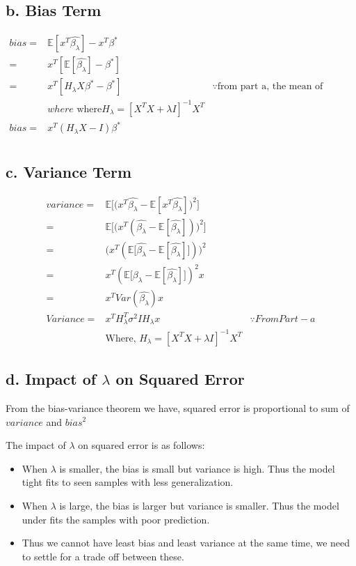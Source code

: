 \documentclass[letterpaper,doc,notimes]{apa6}
\begin{document}
\subsection{b. Bias Term}
\begin{align*}
	bias = & \mathbb{E}[x^T\hat{\beta_\lambda}] - x^T\beta^* & \\
	      = &x^T[ \mathbb{E}[\hat{\beta_\lambda}] - \beta^*] &  \\
	      = & x^T[H_\lambda X \beta^* - \beta^*] & \because \text{from part a, the mean of Gaussian} \\
			 &where \text{ where} H_\lambda = [ X^TX +  \lambda I ]^{-1}  X^T & \\    
   bias = & x^T(H_\lambda X  - I) \beta^* & \\
\end{align*}
\subsection{c. Variance Term}
\begin{align*}
	variance = & \mathbb{E} \bigg[ \big( x^T\hat{\beta_\lambda} - \mathbb{E}[x^T\hat{\beta_\lambda}] \big)^2 \bigg] & \\
	= & \mathbb{E} \bigg[ \big( x^T (\hat{\beta_\lambda} - \mathbb{E}[\hat{\beta_\lambda}] )\big)^2 \bigg]  &\\
	= & \bigg( x^T ( \mathbb{E}\big[\hat{\beta_\lambda} - \mathbb{E}[\hat{\beta_\lambda}] \big] )\bigg)^2  &\\
	= &  x^T ( \mathbb{E}\big[\hat{\beta_\lambda} - \mathbb{E}[\hat{\beta_\lambda}] \big] )^2 x  &\\
  = & x^T  Var(\hat{\beta_\lambda})  x &\\
Variance  = & x^T  H_\lambda^T \sigma^2 I H_\lambda x &  \because From Part-a \\
    & \text{Where, } H_\lambda = [ X^TX +  \lambda I ]^{-1}  X^T
\end{align*}
 
\subsection{d. Impact of $\lambda$  on Squared Error}
From the bias-variance theorem we have, squared error is proportional to sum of $variance$ and $bias^2$ 

The impact of $\lambda$ on squared error is as follows:
\begin{itemize}
	\item When $\lambda$ is smaller, the bias is small but variance is high. Thus the model tight fits to seen samples with less generalization.
	\item When $\lambda$ is large, the bias is larger but variance is smaller. Thus the model under fits the samples with poor prediction.
	\item Thus we cannot have least bias and least variance at the same time, we need to settle for a trade off between these.
\end{itemize}
\end{document}
